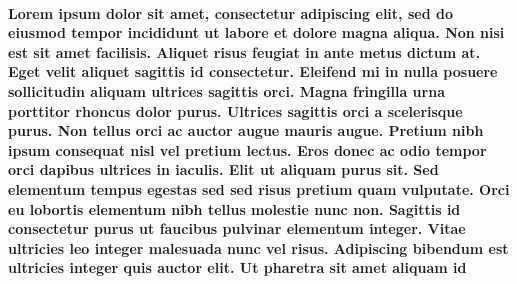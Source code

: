 
\paragraph{Lorem ipsum dolor sit amet, consectetur adipiscing elit, sed do eiusmod tempor incididunt ut labore et dolore magna aliqua. Non nisi est sit amet facilisis. Aliquet risus feugiat in ante metus dictum at. Eget velit aliquet sagittis id consectetur. Eleifend mi in nulla posuere sollicitudin aliquam ultrices sagittis orci. Magna fringilla urna porttitor rhoncus dolor purus. Ultrices sagittis orci a scelerisque purus. Non tellus orci ac auctor augue mauris augue. Pretium nibh ipsum consequat nisl vel pretium lectus. Eros donec ac odio tempor orci dapibus ultrices in iaculis. Elit ut aliquam purus sit. Sed elementum tempus egestas sed sed risus pretium quam vulputate. Orci eu lobortis elementum nibh tellus molestie nunc non. Sagittis id consectetur purus ut faucibus pulvinar elementum integer. Vitae ultricies leo integer malesuada nunc vel risus. Adipiscing bibendum est ultricies integer quis auctor elit. Ut pharetra sit amet aliquam id}



